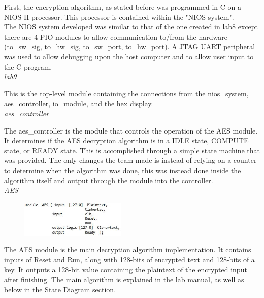 \documentclass[journal, twocolumn, final,11pt,letterpaper]{IEEEtran}
\begin{document}
First, the encryption algorithm, as stated before was programmed in C on a NIOS-II processor. This processor is contained within the "NIOS system". \\

The NIOS system developed was similar to that of the one created in lab8 except there are 4 PIO modules to allow communication to/from the hardware (to\_sw\_sig, to\_hw\_sig, to\_sw\_port, to\_hw\_port). A JTAG UART peripheral was used to allow debugging upon the host computer and to allow user input to the C program. \\

\textit{lab9}\\
\vspace{-4mm}

This is the top-level module containing the connections from the nios\_system, aes\_controller, io\_module, and the hex display. \\

\textit{aes\_controller}\\
\vspace{-4mm}

The aes\_controller is the module that controls the operation of the AES module. It determines if the AES decryption algorithm is in a IDLE state, COMPUTE state, or READY state. This is accomplished through a simple state machine that was provided. The only changes the team made is instead of relying on a counter to determine when the algorithm was done, this was instead done inside the algorithm itself and output through the module into the controller.\\

\textit{AES}\\
\vspace{-4mm}

\begin{figure}[h]
	\centering
	\includegraphics[width=0.45\textwidth]{AES.jpg}
	\label{fig:AES}
\end{figure}

The AES module is the main decryption algorithm implementation. It contains inputs of Reset and Run, along with 128-bits of encrypted text and 128-bits of a key. It outputs a 128-bit value containing the plaintext of the encrypted input after finishing. The main algorithm is explained in the lab manual, as well as below in the State Diagram section. \\
\end{document}
